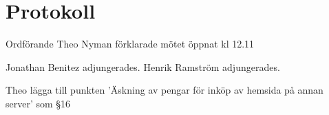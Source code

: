 \documentclass[10pt]{article}
\def\mo{Theo Nyman}
\begin{document}
\section*{Protokoll}
\begin{paragrafer}
Ordförande {\mo} förklarade mötet öppnat kl 12.11

{\valavmo}

{\valavms}

{\valavj}

{\tosg}











Jonathan Benitez adjungerades.
Henrik Ramström adjungerades.





Theo \ypa lägga till punkten 'Äskning av pengar för inköp av hemsida på annan server' som §16


\end{paragrafer}
\end{document}
